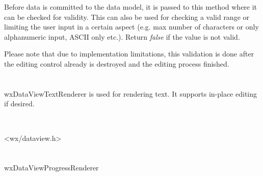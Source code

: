 \label{wxdataviewrenderervalidate}


Before data is committed to the data model, it is passed to this
method where it can be checked for validity. This can also be
used for checking a valid range or limiting the user input in
a certain aspect (e.g. max number of characters or only alphanumeric
input, ASCII only etc.). Return {\it false} if the value is
not valid.

Please note that due to implementation limitations, this validation
is done after the editing control already is destroyed and the
editing process finished.


\section{}\label{wxdataviewtextrenderer}

wxDataViewTextRenderer is used for rendering text. It supports
in-place editing if desired.



\\


<wx/dataview.h>





\label{wxdataviewtextrendererwxdataviewtextrenderer}




\section{}\label{wxdataviewprogressrenderer}

wxDataViewProgressRenderer



\\

